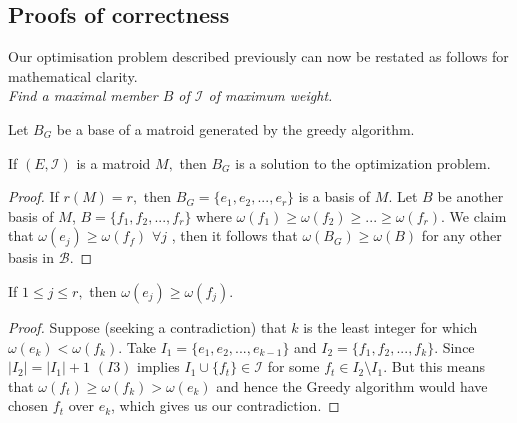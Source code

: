 \documentclass[../main.tex]{subfiles}
\begin{document}
\subsection{Proofs of correctness}
Our optimisation problem described previously can now be restated as follows for mathematical clarity.\\
\noindent\Problem \textit{Find a maximal member $B$ of $\mathcal{I}$ of maximum weight.}
\begin{note}
Let $B_G$ be a base of a matroid generated by the greedy algorithm.
\end{note}
\begin{thm}
If $(E,\mathcal{I})$ is a matroid $M,$ then $B_G$ is a solution to the optimization problem.
\end{thm}
\begin{proof}
If $r(M) = r,$ then $B_G = \{e_1,e_2, ..., e_r\}$ is a basis of $M.$ Let $B$ be another basis of $M$, $B = \{f_1, f_2, ..., f_r\}$
where $\omega(f_1) \geq \omega(f_2) \geq ... \geq \omega(f_r).$ We claim that $\omega(e_j) \geq \omega(f_f)$ $ \forall j$ , then it follows that $\omega(B_G) \geq \omega(B)$ for any other basis in $\mathcal{B}.$
\end{proof}

\begin{lem}
If $1 \leq j \leq r,$ then $\omega(e_j) \geq \omega(f_j).$
\end{lem}
\begin{proof}
Suppose (seeking a contradiction) that $k$ is the least integer for which $\omega(e_k) < \omega(f_k).$ Take $I_1 = \{e_1, e_2, ..., e_{k-1}\}$ and $I_2 = \{f_1, f_2, ..., f_{k}\}.$ Since $|I_2| = |I_1|+1$  $(I3)$ implies $I_1 \cup \{f_t\} \in \mathcal{I}$ for some $f_t \in I_2 \setminus I_1.$ But this means that $\omega(f_t) \geq \omega(f_k) > \omega(e_k)$ and hence the Greedy algorithm would have chosen $f_t$ over $e_k$, which gives us our contradiction.
\end{proof}
\end{document}
